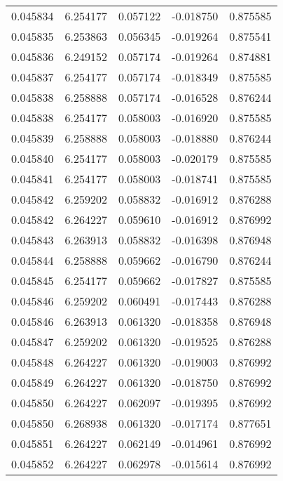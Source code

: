 \begin{tabular}{lrrrr}
0.045834    &  6.254177 &  0.057122 & -0.018750 &             0.875585 \\
0.045835    &  6.253863 &  0.056345 & -0.019264 &             0.875541 \\
0.045836    &  6.249152 &  0.057174 & -0.019264 &             0.874881 \\
0.045837    &  6.254177 &  0.057174 & -0.018349 &             0.875585 \\
0.045838    &  6.258888 &  0.057174 & -0.016528 &             0.876244 \\
0.045838    &  6.254177 &  0.058003 & -0.016920 &             0.875585 \\
0.045839    &  6.258888 &  0.058003 & -0.018880 &             0.876244 \\
0.045840    &  6.254177 &  0.058003 & -0.020179 &             0.875585 \\
0.045841    &  6.254177 &  0.058003 & -0.018741 &             0.875585 \\
0.045842    &  6.259202 &  0.058832 & -0.016912 &             0.876288 \\
0.045842    &  6.264227 &  0.059610 & -0.016912 &             0.876992 \\
0.045843    &  6.263913 &  0.058832 & -0.016398 &             0.876948 \\
0.045844    &  6.258888 &  0.059662 & -0.016790 &             0.876244 \\
0.045845    &  6.254177 &  0.059662 & -0.017827 &             0.875585 \\
0.045846    &  6.259202 &  0.060491 & -0.017443 &             0.876288 \\
0.045846    &  6.263913 &  0.061320 & -0.018358 &             0.876948 \\
0.045847    &  6.259202 &  0.061320 & -0.019525 &             0.876288 \\
0.045848    &  6.264227 &  0.061320 & -0.019003 &             0.876992 \\
0.045849    &  6.264227 &  0.061320 & -0.018750 &             0.876992 \\
0.045850    &  6.264227 &  0.062097 & -0.019395 &             0.876992 \\
0.045850    &  6.268938 &  0.061320 & -0.017174 &             0.877651 \\
0.045851    &  6.264227 &  0.062149 & -0.014961 &             0.876992 \\
0.045852    &  6.264227 &  0.062978 & -0.015614 &             0.876992 \\

\end{tabular}
